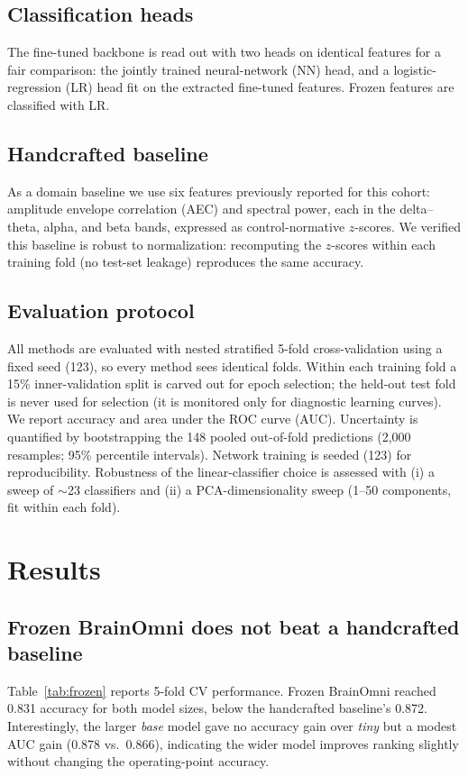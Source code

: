 \documentclass[11pt]{article}
\begin{document}
\subsection{Classification heads}
The fine-tuned backbone is read out with two heads on identical features for a fair comparison:
the jointly trained neural-network (NN) head, and a logistic-regression (LR) head fit on the
extracted fine-tuned features. Frozen features are classified with LR.

\subsection{Handcrafted baseline}
As a domain baseline we use six features previously reported for this cohort: amplitude envelope
correlation (AEC) and spectral power, each in the delta--theta, alpha, and beta bands, expressed as
control-normative $z$-scores. We verified this baseline is robust to normalization: recomputing the
$z$-scores within each training fold (no test-set leakage) reproduces the same accuracy.

\subsection{Evaluation protocol}
All methods are evaluated with nested stratified 5-fold cross-validation using a fixed seed (123),
so every method sees identical folds. Within each training fold a 15\% inner-validation split is
carved out for epoch selection; the held-out test fold is never used for selection (it is monitored
only for diagnostic learning curves). We report accuracy and area under the ROC curve (AUC).
Uncertainty is quantified by bootstrapping the 148 pooled out-of-fold predictions
(2{,}000 resamples; 95\% percentile intervals). Network training is seeded (123) for reproducibility.
Robustness of the linear-classifier choice is assessed with (i) a sweep of $\sim$23 classifiers and
(ii) a PCA-dimensionality sweep (1--50 components, fit within each fold).

\section{Results}

\subsection{Frozen BrainOmni does not beat a handcrafted baseline}
Table~\ref{tab:frozen} reports 5-fold CV performance. Frozen BrainOmni reached 0.831 accuracy for
both model sizes, below the handcrafted baseline's 0.872. Interestingly, the larger \emph{base}
model gave no accuracy gain over \emph{tiny} but a modest AUC gain (0.878 vs.\ 0.866), indicating the
wider model improves ranking slightly without changing the operating-point accuracy.
\end{document}

